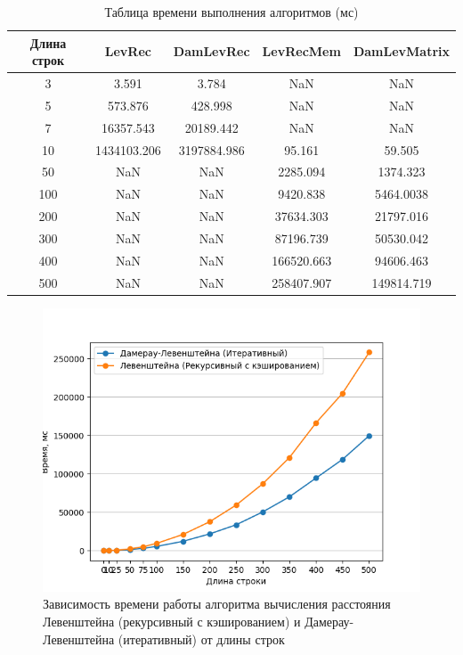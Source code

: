 \begin{table} [h!]
	\caption{Таблица времени выполнения алгоритмов (мс)}
	\label{tbl:profilingalgs}
	\begin{center}
		\begin{tabular}{|c|c|c|c|c|} 
		 	\hline
			Длина строк & LevRec & DamLevRec & LevRecMem & DamLevMatrix \\  
		 	\hline
		 	3 & 3.591 & 3.784 & NaN & NaN\\
		 	\hline
		 	5 & 573.876 & 428.998 & NaN & NaN\\
		 	\hline
		 	7 & 16357.543 & 20189.442 & NaN & NaN\\
		 	\hline
		 	10 & 1434103.206 & 3197884.986 & 95.161  & 59.505 \\
		 	\hline
		 	50 & NaN & NaN & 2285.094 &  1374.323 \\
		 	\hline
		 	100 & NaN & NaN & 9420.838 & 5464.0038 \\
		 	\hline
			200 & NaN & NaN & 37634.303 & 21797.016 \\
			\hline
			300 & NaN & NaN & 87196.739 & 50530.042  \\
			\hline
			400 & NaN & NaN & 166520.663 & 94606.463 \\
			\hline
			500 & NaN & NaN & 258407.907 & 149814.719 \\
			\hline
		\end{tabular}
	\end{center}
\end{table}

\begin{figure}[h]
	\centering
	\includegraphics[scale=0.4]{imgs/2.png}
	\caption{Зависимость времени работы алгоритма вычисления
расстояния Левенштейна (рекурсивный с кэшированием) и Дамерау-Левенштейна (итеративный) от длины строк}
	\label{img:profiling1}
\end{figure}

